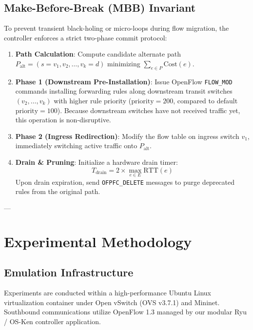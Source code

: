 \documentclass[10pt,twocolumn]{article}
\begin{document}
\subsection{Make-Before-Break (MBB) Invariant}
To prevent transient black-holing or micro-loops during flow migration, the controller enforces a strict two-phase commit protocol:
\begin{enumerate}
    \item \textbf{Path Calculation}: Compute candidate alternate path $P_{\text{alt}} = (s = v_1, v_2, \dots, v_k = d)$ minimizing $\sum_{e \in P} \text{Cost}(e)$.
    \item \textbf{Phase 1 (Downstream Pre-Installation)}: Issue OpenFlow \texttt{FLOW\_MOD} commands installing forwarding rules along downstream transit switches $(v_2, \dots, v_k)$ with higher rule priority ($\text{priority} = 200$, compared to default $\text{priority} = 100$). Because downstream switches have not received traffic yet, this operation is non-disruptive.
    \item \textbf{Phase 2 (Ingress Redirection)}: Modify the flow table on ingress switch $v_1$, immediately switching active traffic onto $P_{\text{alt}}$.
    \item \textbf{Drain \& Pruning}: Initialize a hardware drain timer:
    \begin{equation}
    T_{\text{drain}} = 2 \times \max_{e \in E} \text{RTT}(e)
    \end{equation}
    Upon drain expiration, send \texttt{OFPFC\_DELETE} messages to purge deprecated rules from the original path.
\end{enumerate}

---

\section{Experimental Methodology}
\label{sec:methodology}

\subsection{Emulation Infrastructure}
Experiments are conducted within a high-performance Ubuntu Linux virtualization container under Open vSwitch (OVS v3.7.1) and Mininet. Southbound communications utilize OpenFlow 1.3 managed by our modular Ryu / OS-Ken controller application.
\end{document}
